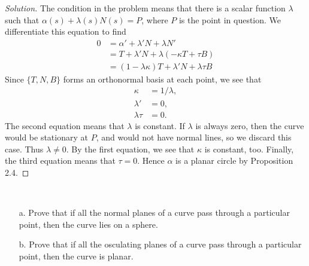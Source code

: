 \documentclass[Shifrin_Solutions_Spring_2018]{subfiles}
\begin{document}
\begin{proof}[Solution]
The condition in the problem means that there is a scalar function $\lambda$ such that $\alpha(s)  + \lambda(s)N(s) = P$, where $P$ is the point in question. We differentiate this equation to find
\[
\begin{split}
0 & = \alpha' + \lambda'N + \lambda N' \\
	& = T + \lambda' N + \lambda (-\kappa T +\tau B ) \\
	& = (1-\lambda\kappa) T + \lambda' N + \lambda\tau B
\end{split}
\]
Since $\{ T, N, B \}$ forms an orthonormal basis at each point, we see that
\begin{align*}
\kappa & = 1/\lambda , \\
\lambda' & = 0, \\
\lambda\tau & = 0 .
\end{align*}
The second equation means that $\lambda$ is constant. If $\lambda$ is always zero, then the curve would be stationary at $P$, and would not have normal lines, so we discard this case. Thus $\lambda \neq 0$. By the first equation, we see that $\kappa$ is constant, too. Finally, the third equation means that $\tau =0$. Hence $\alpha$ is a planar circle by Proposition 2.4.
\end{proof}

\vspace{.5cm}


\begin{exercise}$\ $ \\
\begin{itemize}
\item[a.] Prove that if all the normal planes of a curve pass through a particular point, then the curve lies on a sphere.
\item[b.] Prove that if all the osculating planes of a curve pass through a particular point, then the curve is planar.
\end{itemize}
\end{exercise}
\end{document}
